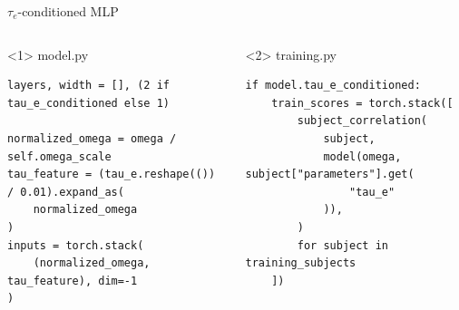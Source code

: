 \documentclass[aspectratio=169,11pt]{beamer}
\begin{document}
\begin{frame}[t,fragile]{$\tau_e$-conditioned MLP}

\begin{columns}[T,onlytextwidth]
\begin{onlyenv}<1>
\textcolor{DeckGray}{\small model.py}
\begin{lstlisting}[breaklines=true,breakatwhitespace=false,basicstyle=\ttfamily\footnotesize,linewidth=\linewidth]
layers, width = [], (2 if tau_e_conditioned else 1)

normalized_omega = omega / self.omega_scale
tau_feature = (tau_e.reshape(()) / 0.01).expand_as(
    normalized_omega
)
inputs = torch.stack(
    (normalized_omega, tau_feature), dim=-1
)
\end{lstlisting}
\end{onlyenv}
\begin{onlyenv}<2>
\textcolor{DeckGray}{\small training.py}
\begin{lstlisting}[breaklines=true,breakatwhitespace=false,basicstyle=\ttfamily\footnotesize,linewidth=\linewidth]
if model.tau_e_conditioned:
    train_scores = torch.stack([
        subject_correlation(
            subject,
            model(omega, subject["parameters"].get(
                "tau_e"
            )),
        )
        for subject in training_subjects
    ])
\end{lstlisting}
\end{onlyenv}
\end{columns}

\end{frame}
\end{document}

